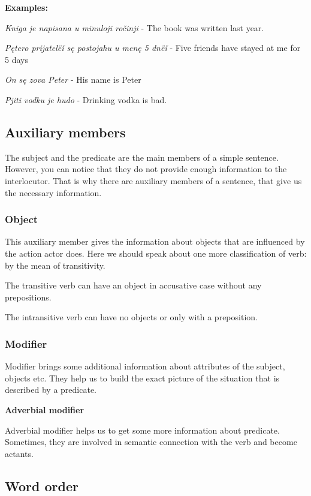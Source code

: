 \textbf{Examples:}

\textit{Kniga je napisana u mïnuloji ročinji} - The book was written last year.

\textit{Pętero prijatelëǐ sę postojahu u menę 5 dnëǐ} - Five friends have stayed at me for 5 days 

\textit{On sę zova Peter} - His name is Peter

\textit{Pjiti vodku je hudo} - Drinking vodka is bad.

\subsection{Auxiliary members}

The subject and the predicate are the main members of a simple sentence. However, you can notice that they do not provide  enough information to the interlocutor. That is why there are auxiliary members of a sentence, that give us the necessary information.

\subsubsection{Object}

This auxiliary member gives the information about objects that are influenced by the action actor does. 
Here we should speak about one more classification of verb: by the mean of transitivity.

The transitive verb can have an object in accusative case without any prepositions.

The intransitive verb can have no objects or only with a preposition. 

\subsubsection{Modifier}

Modifier brings some additional information about attributes of the subject, objects etc. They help us to build the exact picture of the situation that is described by a predicate.

\textbf{Adverbial modifier}

Adverbial modifier helps us to get some more information about predicate. Sometimes, they are involved in semantic connection with the verb and become actants. 

\subsection{Word order}

